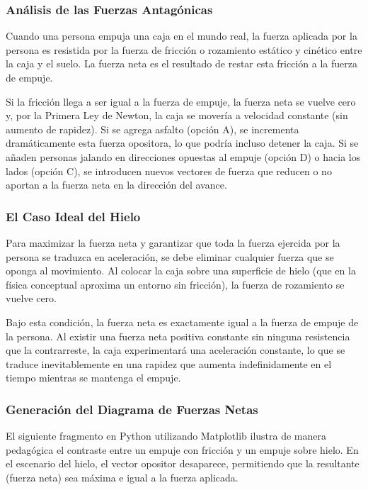 \documentclass[12pt, a4paper]{article}
\begin{document}
\subsubsection*{Análisis de las Fuerzas Antagónicas}

Cuando una persona empuja una caja en el mundo real, la fuerza aplicada por la persona es resistida por la fuerza de fricción o rozamiento estático y cinético entre la caja y el suelo. La fuerza neta es el resultado de restar esta fricción a la fuerza de empuje. 

Si la fricción llega a ser igual a la fuerza de empuje, la fuerza neta se vuelve cero y, por la Primera Ley de Newton, la caja se movería a velocidad constante (sin aumento de rapidez). Si se agrega asfalto (opción A), se incrementa dramáticamente esta fuerza opositora, lo que podría incluso detener la caja. Si se añaden personas jalando en direcciones opuestas al empuje (opción D) o hacia los lados (opción C), se introducen nuevos vectores de fuerza que reducen o no aportan a la fuerza neta en la dirección del avance. 

\subsubsection*{El Caso Ideal del Hielo}

Para maximizar la fuerza neta y garantizar que toda la fuerza ejercida por la persona se traduzca en aceleración, se debe eliminar cualquier fuerza que se oponga al movimiento. Al colocar la caja sobre una superficie de hielo (que en la física conceptual aproxima un entorno sin fricción), la fuerza de rozamiento se vuelve cero. 

Bajo esta condición, la fuerza neta es exactamente igual a la fuerza de empuje de la persona. Al existir una fuerza neta positiva constante sin ninguna resistencia que la contrarreste, la caja experimentará una aceleración constante, lo que se traduce inevitablemente en una rapidez que aumenta indefinidamente en el tiempo mientras se mantenga el empuje.

\subsubsection*{Generación del Diagrama de Fuerzas Netas}

El siguiente fragmento en Python utilizando Matplotlib ilustra de manera pedagógica el contraste entre un empuje con fricción y un empuje sobre hielo. En el escenario del hielo, el vector opositor desaparece, permitiendo que la resultante (fuerza neta) sea máxima e igual a la fuerza aplicada.
\end{document}
